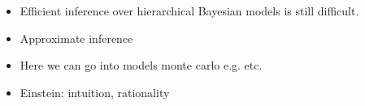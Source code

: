 \begin{itemize}
    \item Efficient inference over hierarchical Bayesian models is still difficult.
    \item Approximate inference
    \item Here we can go into models monte carlo e.g. etc.
    \item Einstein: intuition, rationality
\end{itemize}


































































































































